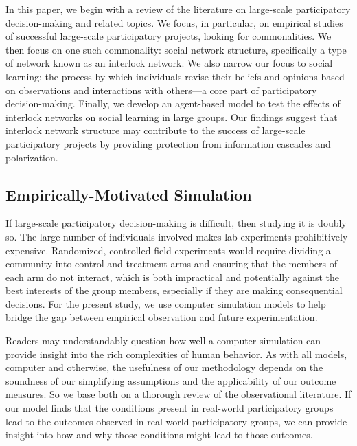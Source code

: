 \documentclass[manuscript,screen,review,acmsmall]{acmart}
\begin{document}
In this paper, we begin with a review of the literature on large-scale participatory decision-making and related topics.
We focus, in particular, on empirical studies of successful large-scale participatory projects, looking for commonalities.
We then focus on one such commonality: social network structure,
specifically a type of network known as an interlock network.
We also narrow our focus to social learning:
the process by which individuals revise their beliefs and opinions
based on observations and interactions with others---a core part of participatory decision-making.
Finally, we develop an agent-based model
to test the effects of interlock networks on social learning
in large groups.
Our findings suggest that interlock network structure may contribute to the success of large-scale participatory projects by providing protection from information cascades and polarization.

\subsection{Empirically-Motivated Simulation}

If large-scale participatory decision-making is difficult,
then studying it is doubly so.
The large number of individuals involved makes lab experiments prohibitively expensive.
Randomized, controlled field experiments would require dividing
a community into control and treatment arms
and ensuring that the members of each
arm do not interact,
which is both impractical and potentially
against the best interests of the group members,
especially if they are making consequential decisions.
For the present study, we use computer simulation models to help bridge the gap
between empirical observation and future experimentation.

Readers may understandably question how well a computer simulation can provide insight into the rich complexities of human behavior.
As with all models, computer and otherwise,
the usefulness of our methodology depends on the soundness of our simplifying assumptions and the applicability of our outcome measures.
So we base both on a thorough review of the observational literature.
If our model finds that the conditions present in real-world participatory groups lead to the outcomes observed in real-world participatory groups,
we can provide insight into how and why those conditions might lead to those outcomes.
\end{document}

